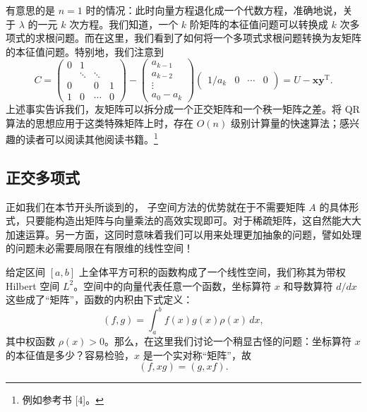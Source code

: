 有意思的是 $n=1$ 时的情况：此时向量方程退化成一个代数方程，准确地说，关于 $\lambda$ 的一元 $k$ 次方程。我们知道，一个 $k$ 阶矩阵的本征值问题可以转换成 $k$ 次多项式的求根问题。而在这里，我们看到了如何将一个多项式求根问题转换为友矩阵的本征值问题。特别地，我们注意到
\begin{equation}
C=
\begin{pmatrix}
0&1&&\\
&\ddots&\ddots&\\
0&&0&1\\
1&0&\cdots&0
\end{pmatrix}
-
\begin{pmatrix}
a_{k-1}\\a_{k-2}\\\vdots\\a_0-a_k
\end{pmatrix}
\begin{pmatrix}1/a_k&0&\cdots&0\end{pmatrix}
=U-\bm x\bm y^{\mathrm T}.
\tag{3.5.26}
\end{equation}
上述事实告诉我们，友矩阵可以拆分成一个正交矩阵和一个秩一矩阵之差。将 QR 算法的思想应用于这类特殊矩阵上时，存在 $O(n)$ 级别计算量的快速算法；感兴趣的读者可以阅读其他阅读书籍。\footnote{例如参考书 [4]。}

\subsection{正交多项式}

正如我们在本节开头所谈到的， 子空间方法的优势就在于不需要矩阵 $A$ 的具体形式，只要能构造出矩阵与向量乘法的高效实现即可。对于稀疏矩阵，这自然能大大加速运算。另一方面，这同时意味着我们可以用来处理更加抽象的问题，譬如处理的问题未必需要局限在有限维的线性空间！

给定区间 $[a,b]$ 上全体平方可积的函数构成了一个线性空间，我们称其为带权 Hilbert 空间 $L^2$。空间中的向量代表任意一个函数，坐标算符 $x$ 和导数算符 $d/dx$ 这些成了“矩阵”，函数的内积由下式定义：
\begin{equation}
(f,g)=\int_a^b f(x)g(x)\rho(x)\,dx,
\tag{3.5.27}
\end{equation}
其中权函数 $\rho(x)>0$。那么，在这里我们讨论一个稍显古怪的问题：坐标算符 $x$ 的本征值是多少？容易检验，$x$ 是一个实对称“矩阵”，故
\begin{equation}
(f,xg)=(g,xf).
\tag{3.5.28}
\end{equation}

